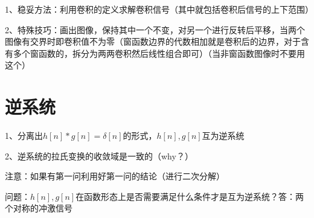 1、稳妥方法：利用卷积的定义求解卷积信号（其中就包括卷积后信号的上下范围）

2、特殊技巧：画出图像，保持其中一个不变，对另一个进行反转后平移，当两个图像有交界时即卷积值不为零（窗函数边界的代数相加就是卷积后的边界，对于含有多个窗函数的，拆分为两两卷积然后线性组合即可）（当非窗函数图像时不要用这个）

\section{逆系统}

1、分离出$h[n]*g[n]=\delta[n]$的形式，$h[n],g[n]$互为逆系统

2、逆系统的拉氏变换的收敛域是一致的（why？）

注意：如果有第一问利用好第一问的结论（进行二次分解）

问题：$h[n],g[n]$在函数形态上是否需要满足什么条件才是互为逆系统？答：两个对称的冲激信号

